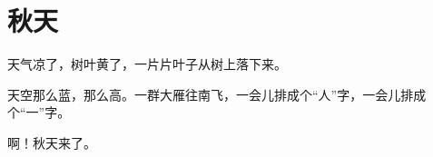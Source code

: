 \documentclass[12pt,UTF-8,openany]{ctexbook}
\begin{document}
\clearpage

\begin{center}
    
\end{center}


\hanzibox{}\hanzibox{}\hanzibox{}\hanzibox{}\hspace{1em}\hanzibox{}\hanzibox{}\hanzibox{}\hanzibox{}

\hanzibox{}\hanzibox{}\hanzibox{}\hanzibox{}\hspace{1em}\hanzibox{}\hanzibox{}\hanzibox{}\hanzibox{}

\hanzibox{}\hanzibox{}\hanzibox{}\hanzibox{}\hspace{1em}\hanzibox{}\hanzibox{}\hanzibox{}\hanzibox{}






\chapter{秋天}

\begin{large}
    
    天气凉了，树叶黄了，一片片叶子从树上落下来。
    
    天空那么蓝，那么高。一群大雁往南飞，一会儿排成个“人”字，一会儿排成个“一”字。
    
    啊！秋天来了。
    
\end{large}


\clearpage

\begin{center}
    
\end{center}


\hanzibox{}\hanzibox{}\hanzibox{}\hanzibox{}\hspace{1em}\hanzibox{}\hanzibox{}\hanzibox{}\hanzibox{}

\hanzibox{}\hanzibox{}\hanzibox{}\hanzibox{}\hspace{1em}\hanzibox{}\hanzibox{}\hanzibox{}\hanzibox{}

\hanzibox{}\hanzibox{}\hanzibox{}\hanzibox{}\hspace{1em}
\end{document}
